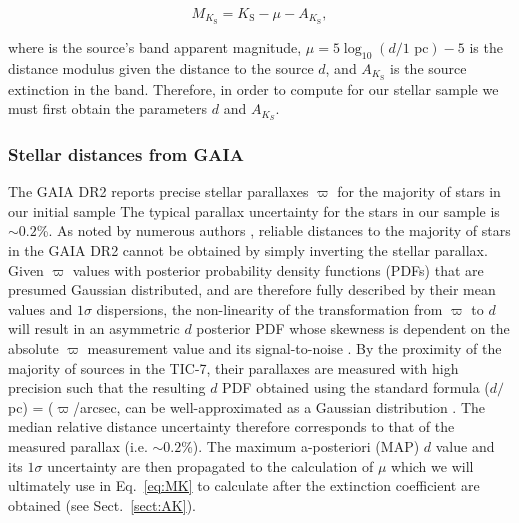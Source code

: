 \begin{equation}
  M_{K_{\text{S}}} = K_{\text{S}} - \mu - A_{K_{\text{S}}}, \label{eq:MK}
\end{equation}

\noindent where \Ks{} is the source's \Ks{-}band apparent magnitude, $\mu = 5\log_{10}{(d/\text{1 pc})} - 5$
is the distance modulus given the distance to the source $d$, and $A_{K_{\text{S}}}$ is the source extinction in the
\Ks{-}band. Therefore, in order to compute \MK{} for our stellar sample we must first obtain the parameters $d$ and
$A_{K_S}$.

\subsubsection{Stellar distances from GAIA}
The GAIA DR2 reports precise stellar parallaxes $\varpi$ for the majority of stars in our initial sample
The typical parallax uncertainty for the stars in our sample is $\sim 0.2$\%.
As noted by numerous authors \citep[e.g.][]{bailorjones15,astraatmadja16,luri18}, reliable distances to the
majority of stars in the GAIA DR2 cannot be obtained by simply inverting the stellar parallax. Given $\varpi$
values with posterior probability density functions (PDFs) that are presumed Gaussian distributed, and are
therefore fully described by their mean values and $1\sigma$ dispersions, the non-linearity
of the transformation from $\varpi$ to $d$ will result in an asymmetric $d$ posterior PDF whose skewness
is dependent on the absolute $\varpi$ measurement value and its signal-to-noise \citep{luri18}.
By the proximity of the majority of sources in the TIC-7, their parallaxes are measured with high precision such
that the resulting $d$ PDF obtained using the standard formula ($d/$ pc) = ($\varpi$/arcsec, can be well-approximated
as a Gaussian distribution \citep{bailorjones18}. The median relative distance uncertainty therefore corresponds to 
that of the measured parallax (i.e. $\sim 0.2$\%). The maximum a-posteriori (MAP) $d$ value and its $1\sigma$
uncertainty are then propagated to the calculation of $\mu$ which we will ultimately use in Eq.~\ref{eq:MK} to
calculate \MK{} after the extinction coefficient are obtained (see Sect.~\ref{sect:AK}).

